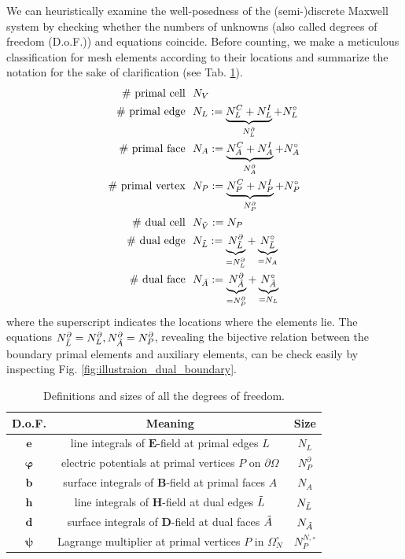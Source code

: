 \documentclass{article}
\begin{document}
We can heuristically examine the well-posedness of the (semi-)discrete Maxwell system by checking whether the numbers of unknowns (also called degrees of freedom (D.o.F.)) and equations coincide. Before counting, we make a meticulous classification for mesh elements according to their locations and summarize the notation for the sake of clarification (see Tab. \ref{tab:def_size_var}). 
\begin{align*}
    \#\  \text{primal cell}\ \  &N_V \\
    \#\  \text{primal edge}\ \  &N_L := \underbrace{N^C_L + N^I_L}_{N^\partial_L} + N^\circ_L  \\
    \#\  \text{primal face}\ \  &N_A := \underbrace{N_A^C + N^I_A}_{N^\partial_A} + N^\circ_A  \\
    \#\  \text{primal vertex}\ \  &N_P := \underbrace{N_P^C + N^I_P}_{N^\partial_P} + N^\circ_P \\
    \#\  \text{dual cell}\ \  &N_{\Tilde{V}} := N_P \\
    \#\  \text{dual edge}\ \  &N_{\Tilde{L}} := \underbrace{N^\partial_{\Tilde{L}}}_{=N^\partial_L} + \underbrace{N^\circ_{\Tilde{L}}}_{=N_A} \\
    \#\  \text{dual face}\ \  &N_{\Tilde{A}} := \underbrace{N^\partial_{\Tilde{A}}}_{=N^\partial_P} + \underbrace{N^\circ_{\Tilde{A}}}_{=N_L}
\end{align*}
where the superscript indicates the locations where the elements lie. The equations $N^\partial_{\Tilde{L}} = N^\partial_L, N^\partial_{\Tilde{A}} = N^\partial_P$, revealing the bijective relation between the boundary primal elements and auxiliary elements, can be check easily by inspecting Fig. \ref{fig:illustraion_dual_boundary}.

\begin{table}[]
    \centering
\begin{tabular}{c c c}
     \hline
     D.o.F.  & Meaning  & Size \\
     \hline
     $\mathbf{e}$ & line integrals of $\mathbf{E}$-field at primal edges $L$& $N_L$ \\
     $\bm{\varphi}$ & electric potentials at primal vertices $P$ on $\partial\Omega$ & $N_P^\partial$ \\
     $\mathbf{b}$ & surface integrals of $\mathbf{B}$-field at primal faces $A$ & $N_A$ \\
     $\mathbf{h}$ & line integrals of $\mathbf{H}$-field at dual edges $\Tilde{L}$ & $N_{\Tilde{L}}$ \\
     $\mathbf{d}$ & surface integrals of $\mathbf{D}$-field at dual faces $\Tilde{A}$ & $N_{\Tilde{A}}$ \\
     $\bm{\psi}$ & Lagrange multiplier at primal vertices $P$ in $\Omega_N^\circ$ & $N^{N,\circ}_P$\\ 
     \hline
\end{tabular}
    \caption{Definitions and sizes of all the degrees of freedom.}
    \label{tab:def_size_var}
\end{table}
\end{document}
